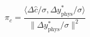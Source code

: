 \documentclass{article}
\begin{document}
\fontsize{22}{29}\selectfont
\[
\pi_c=\frac{\langle\Delta\hat c/\sigma,\Delta y^*_{\mathrm{phys}}/\sigma\rangle}{\|\Delta y^*_{\mathrm{phys}}/\sigma\|^2}
\]
\end{document}
